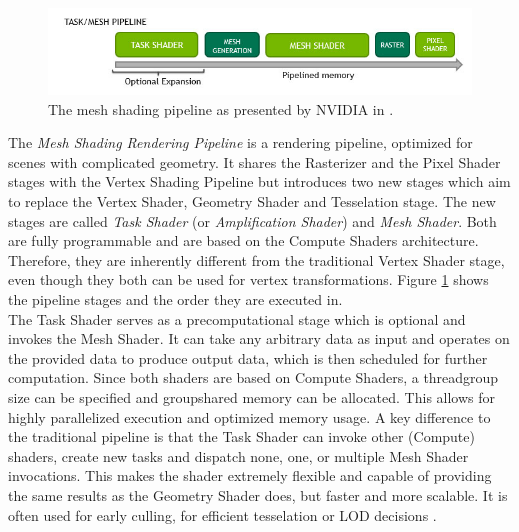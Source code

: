 \begin{figure}[h]
    \centering
    \includegraphics[width=\linewidth]{images/graphics/mesh-rendering-pipeline.jpg}
    \caption{The mesh shading pipeline as presented by NVIDIA in \cite{Kubisch2018}.}
    \label{fig:mesh-rendering-pipeline}
\end{figure}

\noindent
The \emph{Mesh Shading Rendering Pipeline} is a rendering pipeline, optimized for scenes with complicated 
geometry. It shares the Rasterizer and the Pixel Shader stages with the Vertex Shading Pipeline but 
introduces two new stages which aim to replace the Vertex Shader, Geometry Shader and Tesselation stage.
The new stages are called \emph{Task Shader} (or \emph{Amplification Shader}) and \emph{Mesh Shader}. Both 
are fully programmable and are based on the Compute Shaders architecture. Therefore, they are inherently different 
from the traditional Vertex Shader stage, even though they both can be used for vertex transformations.
Figure \ref{fig:mesh-rendering-pipeline} shows the pipeline stages and the order they are executed in. \\

The Task Shader serves as a precomputational stage which is optional and invokes the Mesh Shader.
It can take any arbitrary data as input and operates on the provided data to produce output data, which is then 
scheduled for further computation. Since both shaders are based on Compute Shaders, a threadgroup size can be 
specified  and groupshared memory can be allocated. This allows for highly parallelized execution and optimized 
memory usage. A key difference to the traditional pipeline is that the Task Shader can invoke other (Compute) shaders, 
create new tasks and dispatch none, one, or multiple Mesh Shader invocations. This makes the shader extremely flexible 
and capable of providing the same results as the Geometry Shader does, but faster and more scalable. It is often used 
for early culling, for efficient tesselation or \ac{LOD} decisions \cite{Kubisch2018}. \\

